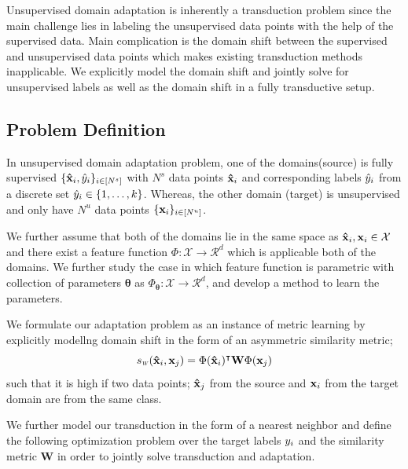 Unsupervised domain adaptation is inherently a transduction problem since the main challenge lies in labeling the unsupervised data points with the help of the supervised data. Main complication is the domain shift between the supervised and unsupervised data points which makes existing transduction methods inapplicable. We explicitly model the domain shift and jointly solve for unsupervised labels as well as the domain shift in a fully transductive setup.

\subsection{Problem Definition}
In unsupervised domain adaptation problem, one of the domains(source) is fully supervised $\{\mathbf{\hat{x}}_i, \hat{y}_i \}_{i \in [N^s]}$ with $N^s$ data points $\mathbf{\hat{x}}_i$ and corresponding labels $\hat{y}_i$ from a discrete set $\hat{y}_i \in \{1,\ldots, k \}$. Whereas, the other domain (target) is unsupervised and only have $N^u$ data points $\{\mathbf{x}_i \}_{i \in [N^u]}$. 


We further assume that both of the domains lie in the same space as $\mathbf{\hat{x}}_i,\mathbf{x}_i \in \mathcal{X}$ and there exist a feature function \mbox{$\Phi:\mathcal{X}\rightarrow \mathcal{R}^d$} which is applicable both of the domains. We further study the case in which feature function is parametric with collection of parameters $\mathbf{\theta}$ as \mbox{$\Phi_\mathbf{\theta}:\mathcal{X}\rightarrow \mathcal{R}^d$}, and develop a method to learn the parameters.


We formulate our adaptation problem as an instance of metric learning by explicitly modellng domain shift in the form of an asymmetric similarity metric;
\begin{equation}
\sw(\xsi,\xuj) = \Phi(\xsi)^\intercal \mathbf{W} \Phi(\xuj)
\end{equation}
such that it is high if two data points; $\mathbf{\hat{x}}_j$ from the source and $\mathbf{x}_i$ from the target domain are from the same class.

We further model our transduction in the form of a nearest neighbor and define the following optimization problem over the target labels $y_i$ and the similarity metric $\mathbf{W}$ in order to jointly solve transduction and adaptation.

